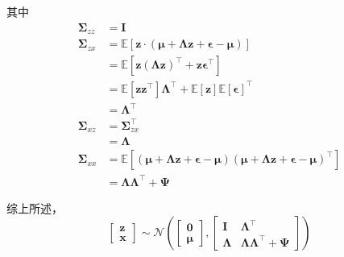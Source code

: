		其中 
		\begin{align*}
			\bm{\Sigma}_{zz} &= \bm{I} \\
			\bm{\Sigma}_{zx} &= \mathbb{E}[\bm{z} \cdot (\bm{\mu} + \bm{\Lambda z} + \bm{\epsilon} - \bm{\mu})] \\
			&= \mathbb{E}[ \bm{z}(\bm{\Lambda z})^\intercal + \bm{z}\bm{\epsilon}^\intercal ] \\
			&= \mathbb{E}[\bm{z z}^\intercal] \bm{\Lambda}^\intercal + \mathbb{E}[\bm{z}] \mathbb{E}[\bm{\epsilon}]^\intercal \\
			&= \bm{\Lambda}^\intercal \\
			\bm{\Sigma}_{xz} &= \bm{\Sigma}_{zx}^\intercal \\
			&= \bm{\Lambda} \\
			\bm{\Sigma}_{xx} &= \mathbb{E}[(\bm{\mu} + \bm{\Lambda z} + \bm{\epsilon} - \bm{\mu}) (\bm{\mu} + \bm{\Lambda z} + \bm{\epsilon} - \bm{\mu})^\intercal] \\
			&= \bm{\Lambda} \bm{\Lambda}^\intercal + \bm{\Psi}
		\end{align*}
		
		综上所述，
		\begin{equation}
			\begin{bmatrix}
				\bm{z} \\
				\bm{x}
			\end{bmatrix} 
			\sim \mathcal{N}\left( 
			\begin{bmatrix}
				\bm{0} \\
				\bm{\mu}
			\end{bmatrix}, 
			\begin{bmatrix}
				\bm{I} & \bm{\Lambda}^\intercal \\
				\bm{\Lambda} & \bm{\Lambda} \bm{\Lambda}^\intercal + \bm{\Psi}
			\end{bmatrix}
			\right)
		\end{equation}
